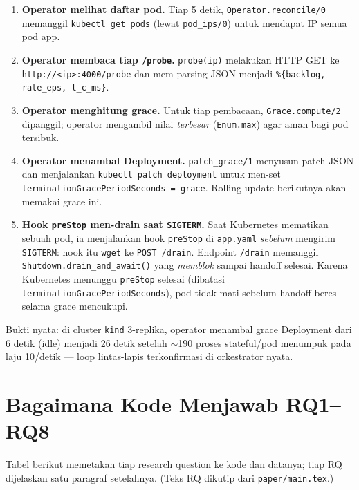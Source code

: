 \documentclass[11pt]{article}
\newcommand{\code}[1]{\texttt{\small #1}}
\begin{document}
\begin{enumerate}
  \item \textbf{Operator melihat daftar pod.} Tiap 5 detik, \code{Operator.reconcile/0} memanggil
  \code{kubectl get pods} (lewat \code{pod\_ips/0}) untuk mendapat IP semua pod app.
  \item \textbf{Operator membaca tiap \texttt{/probe}.} \code{probe(ip)} melakukan HTTP GET ke
  \code{http://<ip>:4000/probe} dan mem-parsing JSON menjadi \code{\%\{backlog, rate\_eps, t\_c\_ms\}}.
  \item \textbf{Operator menghitung grace.} Untuk tiap pembacaan, \code{Grace.compute/2} dipanggil;
  operator mengambil nilai \emph{terbesar} (\code{Enum.max}) agar aman bagi pod tersibuk.
  \item \textbf{Operator menambal Deployment.} \code{patch\_grace/1} menyusun patch JSON dan
  menjalankan \code{kubectl patch deployment} untuk men-set
  \code{terminationGracePeriodSeconds = grace}. Rolling update berikutnya akan memakai grace ini.
  \item \textbf{Hook \texttt{preStop} men-drain saat \texttt{SIGTERM}.} Saat Kubernetes mematikan
  sebuah pod, ia menjalankan hook \code{preStop} di \code{app.yaml} \emph{sebelum} mengirim
  \code{SIGTERM}: hook itu \code{wget} ke \code{POST /drain}. Endpoint \code{/drain} memanggil
  \code{Shutdown.drain\_and\_await()} yang \emph{memblok} sampai handoff selesai. Karena Kubernetes
  menunggu \code{preStop} selesai (dibatasi \code{terminationGracePeriodSeconds}), pod tidak mati
  sebelum handoff beres --- selama grace mencukupi.
\end{enumerate}

Bukti nyata: di cluster \code{kind} 3-replika, operator menambal grace Deployment dari 6 detik (idle)
menjadi 26 detik setelah $\sim$190 proses stateful/pod menumpuk pada laju 10/detik --- loop
lintas-lapis terkonfirmasi di orkestrator nyata.

\section{Bagaimana Kode Menjawab RQ1--RQ8}
\label{sec:rq}

Tabel berikut memetakan tiap research question ke kode dan datanya; tiap RQ dijelaskan satu paragraf
setelahnya. (Teks RQ dikutip dari \code{paper/main.tex}.)
\end{document}

